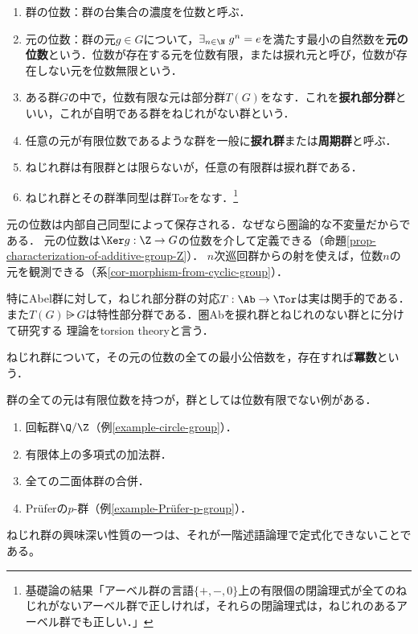 \documentclass[uplatex,dvipdfmx]{jsreport}
\begin{document}
\begin{definition}\mbox{}\label{def-torsion}
    \begin{enumerate}
        \item 群の位数：群の台集合の濃度を位数と呼ぶ．
        \item 元の位数：群の元$g\in G$について，$\exists_{n\in\N}\;g^n=e$を満たす最小の自然数を\textbf{元の位数}という．位数が存在する元を位数有限，または捩れ元と呼び，位数が存在しない元を位数無限という．
        \item ある群$G$の中で，位数有限な元は部分群$T(G)$をなす．これを\textbf{捩れ部分群}といい，これが自明である群をねじれがない群という．
        \item 任意の元が有限位数であるような群を一般に\textbf{捩れ群}または\textbf{周期群}と呼ぶ．
        \item ねじれ群は有限群とは限らないが，任意の有限群は捩れ群である．
        \item ねじれ群とその群準同型は群Torをなす．\footnote{基礎論の結果「アーベル群の言語$\{+,-,0\}$上の有限個の閉論理式が全てのねじれがないアーベル群で正しければ，それらの閉論理式は，ねじれのあるアーベル群でも正しい．」}
    \end{enumerate}
\end{definition}
\begin{remark}[元の位数と群の位数]
    元の位数は内部自己同型によって保存される．なぜなら圏論的な不変量だからである．
    元の位数は$\Ker g:\Z\to G$の位数を介して定義できる（命題\ref{prop-characterization-of-additive-group-Z}）．
    $n$次巡回群からの射を使えば，位数$n$の元を観測できる（系\ref{cor-morphism-from-cyclic-group}）．
\end{remark}
\begin{remark}[Abel圏でのねじれ群]
    特にAbel群に対して，ねじれ部分群の対応$T:\Ab\to\Tor$は実は関手的である．
    また$T(G)\rsub G$は特性部分群である．圏Abを捩れ群とねじれのない群とに分けて研究する
    理論をtorsion theoryと言う．
\end{remark}

\begin{definition}[exponent]
    ねじれ群について，その元の位数の全ての最小公倍数を，存在すれば\textbf{冪数}という．
\end{definition}
\begin{example}[非有限なねじれ群]
    群の全ての元は有限位数を持つが，群としては位数有限でない例がある．
    \begin{enumerate}
        \item 回転群$\Q/\Z$（例\ref{example-circle-group}）．
        \item 有限体上の多項式の加法群．
        \item 全ての二面体群の合併．
        \item Prüferの$p$-群（例\ref{example-Prüfer-p-group}）．
    \end{enumerate}
\end{example}
\begin{remark}
    ねじれ群の興味深い性質の一つは、それが一階述語論理で定式化できないことである。
\end{remark}
\end{document}
